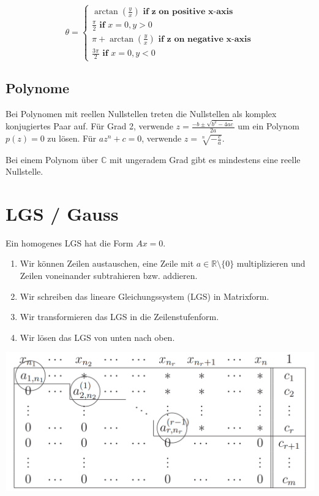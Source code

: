\documentclass[a4paper,10pt]{article}
\begin{document}
$$
\theta = \begin{cases}
  \arctan(\frac{y}{x}) \textbf{ if z on positive x-axis}\\
  \frac{\pi}{2} \textbf{ if }x=0, y > 0\\
  \pi + \arctan(\frac{y}{x}) \textbf{ if z on negative x-axis}\\
  \frac{3\pi}{2} \textbf{ if }x=0, y < 0
\end{cases}
$$

\subsection{Polynome}

Bei Polynomen mit reellen Nullstellen treten die Nullstellen als komplex konjugiertes Paar auf. Für Grad 2, verwende $z = \frac{-b \pm \sqrt{b^2 - 4ac}}{2a}$ um ein Polynom $p(z) = 0$ zu lösen. Für $a z^n + c = 0$, verwende $z = \sqrt[n]{-\frac{c}{a}}$.

Bei einem Polynom über $\mathbb{C}$ mit ungeradem Grad gibt es mindestens eine reelle Nullstelle.

\section{LGS / Gauss}

Ein homogenes LGS hat die Form $Ax = 0$.

\begin{enumerate}
  \item Wir können Zeilen austauschen, eine Zeile mit $a \in \mathbb{R}\setminus \{0\}$ multiplizieren und Zeilen voneinander subtrahieren bzw. addieren.
  \item Wir schreiben das lineare Gleichungssystem (LGS) in Matrixform.
  \item Wir transformieren das LGS in die Zeilenstufenform.
  \item Wir lösen das LGS von unten nach oben.
\end{enumerate}

\begin{center}
  \includegraphics[width=0.8 \linewidth]{gauss.png}
\end{center}
\end{document}
